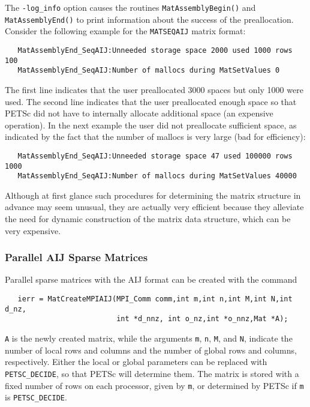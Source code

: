 The {\tt -log\_info}  option causes the routines
{\tt MatAssemblyBegin()} and {\tt MatAssemblyEnd()} to print
information about the success of the preallocation.  Consider the
following example for the {\tt MATSEQAIJ} matrix format:
\begin{verbatim}
   MatAssemblyEnd_SeqAIJ:Unneeded storage space 2000 used 1000 rows 100
   MatAssemblyEnd_SeqAIJ:Number of mallocs during MatSetValues 0
\end{verbatim}
The first line indicates that the user preallocated 3000 spaces but only
1000 were used. The second line indicates that the user preallocated
enough space so that PETSc did not have to internally allocate additional
space (an expensive operation).  In the next example the user did not
preallocate sufficient space, as indicated by the fact that the number
of mallocs is very large (bad for efficiency):
\begin{verbatim}
   MatAssemblyEnd_SeqAIJ:Unneeded storage space 47 used 100000 rows 1000
   MatAssemblyEnd_SeqAIJ:Number of mallocs during MatSetValues 40000
\end{verbatim}
 
Although at first glance such procedures for determining the matrix
structure in advance may seem unusual, they are actually very
efficient because they alleviate the need for dynamic
construction of the matrix data structure, which can be very
expensive.


\subsubsection{Parallel AIJ Sparse Matrices}

Parallel sparse matrices with the AIJ 
format can be created with the command 
\begin{verbatim}
   ierr = MatCreateMPIAIJ(MPI_Comm comm,int m,int n,int M,int N,int d_nz,
                          int *d_nnz, int o_nz,int *o_nnz,Mat *A);
\end{verbatim}
{\tt A} is the newly created matrix, while the arguments {\tt m}, {\tt n}, 
{\tt M}, and {\tt N}, indicate the number of local rows and columns and
the number of global rows and columns, respectively. Either the local or
global parameters can be replaced with {\tt PETSC\_DECIDE}, so that 
PETSc will determine  them.
The matrix is stored with a fixed number of rows on 
each processor, given by {\tt m}, or determined by PETSc if {\tt m} is
{\tt PETSC\_DECIDE}.

